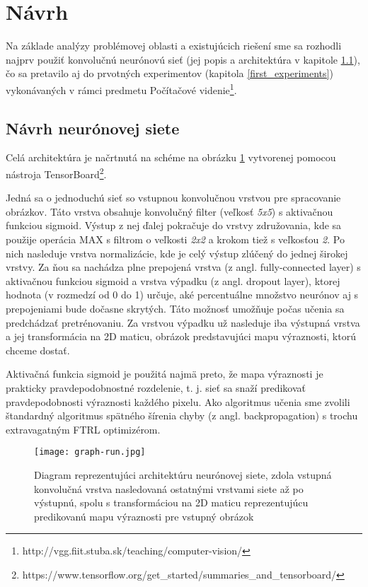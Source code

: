 \newpage

\section{Návrh}

Na základe analýzy problémovej oblasti a existujúcich riešení sme sa rozhodli najprv použiť konvolučnú neurónovú sieť (jej popis a architektúra v kapitole \ref{nn_popis}), čo sa pretavilo aj do prvotných experimentov (kapitola \ref{first_experiments}) vykonávaných v rámci predmetu Počítačové videnie\footnote{http://vgg.fiit.stuba.sk/teaching/computer-vision/}.

\subsection{Návrh neurónovej siete}
\label{nn_popis}

Celá architektúra je načrtnutá na schéme na obrázku \ref{my_tensorboard_cnn} vytvorenej pomocou nástroja  TensorBoard\footnote{https://www.tensorflow.org/get\_started/summaries\_and\_tensorboard/}.

Jedná sa o jednoduchú sieť so vstupnou konvolučnou vrstvou pre spracovanie obrázkov. Táto vrstva obsahuje konvolučný filter (veľkosť \textit{5x5}) s aktivačnou funkciou sigmoid. Výstup z nej ďalej pokračuje do vrstvy združovania, kde sa použije operácia MAX s filtrom o veľkosti \textit{2x2} a krokom tiež s veľkosťou \textit{2}. Po nich nasleduje vrstva normalizácie, kde je celý výstup zlúčený do jednej širokej vrstvy. Za ňou sa nachádza plne prepojená vrstva (z angl. fully-connected layer) s aktivačnou funkciou sigmoid a vrstva výpadku (z angl. dropout layer\cite{dropout}), ktorej hodnota (v rozmedzí od 0 do 1) určuje, aké percentuálne množstvo neurónov aj s prepojeniami bude dočasne skrytých. Táto možnosť umožňuje počas učenia sa predchádzať pretrénovaniu. Za vrstvou výpadku už nasleduje iba výstupná vrstva a jej transformácia na 2D maticu, obrázok predstavujúci mapu výraznosti, ktorú chceme dostať.

Aktivačná funkcia sigmoid je použitá najmä preto, že mapa výraznosti je prakticky pravdepodobnostné rozdelenie, t. j. sieť sa snaží predikovať pravdepodobnosti výraznosti každého pixelu. Ako algoritmus učenia sme zvolili štandardný algoritmus spätného šírenia chyby (z angl. backpropagation) s trochu extravagatným FTRL optimizérom.

\begin{figure}[H]
	\begin{center}\texttt{[image: graph-run.jpg]}
		\caption[Návrh architektúry neurónovej siete]{
			Diagram reprezentujúci architektúru neurónovej siete, zdola vstupná konvolučná vrstva nasledovaná ostatnými vrstvami siete až po výstupnú, spolu s transformáciou na 2D maticu reprezentujúcu predikovanú mapu výraznosti pre vstupný obrázok
		}\label{my_tensorboard_cnn}
	\end{center}
\end{figure}

